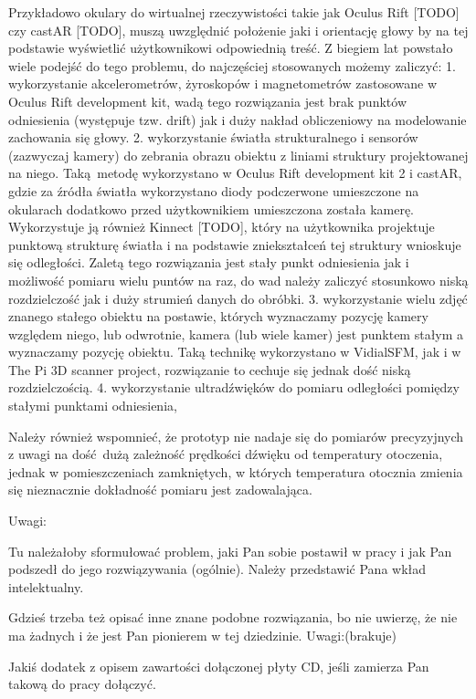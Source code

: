 Przykładowo okulary do wirtualnej rzeczywistości takie jak Oculus Rift [TODO] czy castAR [TODO],
muszą uwzględnić położenie jaki i orientację głowy by na tej podstawie wyświetlić użytkownikowi 
odpowiednią treść. 
Z biegiem lat powstało wiele podejść do tego problemu, do najczęściej stosowanych możemy zaliczyć:
1. wykorzystanie akcelerometrów, żyroskopów i magnetometrów zastosowane w Oculus Rift development kit,
wadą tego rozwiązania jest brak punktów odniesienia (występuje tzw. drift) jak i duży nakład obliczeniowy na
modelowanie zachowania się głowy.
2. wykorzystanie światła strukturalnego i sensorów (zazwyczaj kamery)
 do zebrania obrazu obiektu z liniami struktury projektowanej na niego. Taką metodę wykorzystano w 
 Oculus Rift development kit 2 i castAR, gdzie za źródła światła wykorzystano diody podczerwone umieszczone 
 na okularach dodatkowo przed użytkownikiem umieszczona została kamerę. Wykorzystuje ją również Kinnect [TODO],
który na użytkownika projektuje punktową strukturę światła i na podstawie zniekształceń tej struktury wnioskuje 
 się odległości. Zaletą tego rozwiązania jest stały punkt odniesienia jak i możliwość pomiaru wielu puntów na raz,
 do wad należy zaliczyć stosunkowo niską rozdzielczość jak i duży strumień danych do obróbki.
3. wykorzystanie wielu zdjęć znanego stałego obiektu na postawie, których wyznaczamy pozycję kamery względem niego,
  lub odwrotnie, kamera (lub wiele kamer) jest punktem stałym a wyznaczamy pozycję obiektu.  
 Taką technikę wykorzystano w VidialSFM, jak i w The Pi 3D scanner project, 
 rozwiązanie to cechuje się jednak dość niską rozdzielczością.
4. wykorzystanie ultradźwięków do pomiaru odległości pomiędzy stałymi punktami odniesienia, 



Należy również wspomnieć, że prototyp nie nadaje się do pomiarów precyzyjnych 
z uwagi na dość dużą zależność prędkości dźwięku od temperatury otoczenia,
jednak w pomieszczeniach zamkniętych, w których temperatura otocznia zmienia się nieznacznie
dokładność pomiaru jest zadowalająca.


\newpage
Uwagi: 

Tu należałoby sformułować problem, jaki Pan sobie postawił w pracy i jak Pan podszedł do jego rozwiązywania (ogólnie). 
Należy przedstawić Pana wkład intelektualny.

Gdzieś trzeba też opisać inne znane podobne rozwiązania, bo nie uwierzę, że nie ma żadnych i że jest Pan pionierem w tej dziedzinie.
\newline
Uwagi:(brakuje)

Jakiś dodatek z opisem zawartości dołączonej płyty CD, jeśli zamierza Pan takową do pracy dołączyć.
   